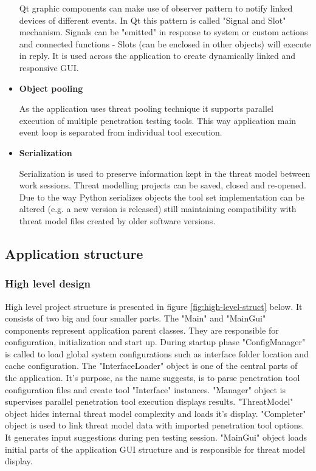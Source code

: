 \begin{itemize}
	Qt graphic components can make use of observer pattern to notify linked devices of different events. In Qt this pattern is called "Signal and Slot" mechanism. Signals can be "emitted" in response to system or custom actions and connected functions - Slots (can be enclosed in other objects) will execute in reply. It is used across the application to create dynamically linked and responsive GUI.
	
	\item \textbf{Object pooling}
	
	As the application uses threat pooling technique it supports parallel execution of multiple penetration testing tools. This way application main event loop is separated from individual tool execution.
	
	\item \textbf{Serialization}
	
	Serialization is used to preserve information kept in the threat model between work sessions. Threat modelling projects can be saved, closed and re-opened. Due to the way Python serializes objects the tool set implementation can be altered (e.g. a new version is released) still maintaining compatibility with threat model files created by older software versions.
	
\end{itemize}

\subsection{Application structure}

\subsubsection{High level design}
High level project structure is presented in figure \ref{fig:high-level-struct} below. \newline
It consists of two big and four smaller parts. The "Main" and "MainGui" components represent application parent classes. They are responsible for configuration, initialization and start up. During startup phase "ConfigManager" is called to load global system configurations such as interface folder location and cache configuration. The "InterfaceLoader" object is one of the central parts of the application. It's purpose, as the name suggests, is to parse penetration tool configuration files and create tool "Interface" instances. "Manager" object is supervises parallel penetration tool execution displays results.
"ThreatModel" object hides internal threat model complexity and loads it's display. "Completer" object is used to link threat model data with imported penetration tool options. It generates input suggestions during pen testing session. 
"MainGui" object loads initial parts of the application GUI structure and is responsible for threat model display.

